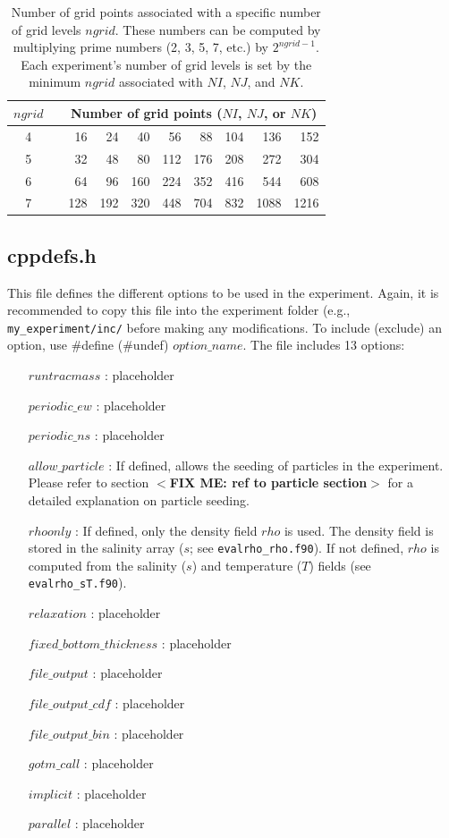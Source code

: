 \documentclass[12pt,letterpaper,titlepage]{article}
\newcommand{\fixme}[1]{\color{red}$<$\textbf{FIX ME: #1}$>$\color{black}}
\begin{document}
\begin{table}[t]
	\caption{\label{tab: ngrid} Number of grid points associated with a specific number of grid levels $ngrid$. These numbers can be computed by multiplying prime numbers (2, 3, 5, 7, etc.) by $2^{ngrid-1}$. Each experiment's number of grid levels is set by the minimum $ngrid$ associated with $NI$, $NJ$, and $NK$.}
	\centering
	\begin{tabular}{ccrrrrrrrr}
		\toprule
		$ngrid$& & \multicolumn{8}{c}{Number of grid points ($NI$, $NJ$, or $NK$)}\\
		\midrule
		4 & &  16  &  24  &  40  &  56  &  88  &  104  &  136  &  152 \\
		5 & &  32  &  48  &  80  &  112  &  176  &  208  &  272  &  304 \\
		6 & &  64  &  96  &  160  &  224  &  352  &  416  &  544  &  608 \\				
		7 & &  128  &  192  &  320  &  448  &  704  &  832  &  1088  &  1216 \\
		\bottomrule
	\end{tabular}
	\label{tab: multiple_regression}
\end{table}

\subsection{cppdefs.h}
\label{sec: cppdefs}
This file defines the different options to be used in the experiment. Again, it is recommended to copy this file into the experiment folder (e.g., \texttt{my\_experiment/inc/} before making any modifications. To include (exclude) an option, use \#define (\#undef) $option\_name$. The file includes 13 options:

\begin{enumerate}
	\item[$runtracmass$ :] placeholder
	\item[$periodic\_ew$ :] placeholder
	\item[$periodic\_ns$ :] placeholder
	\item[$allow\_particle$ :] If defined, allows the seeding of particles in the experiment. Please refer to section \fixme{ref to particle section} for a detailed explanation on particle seeding.
	\item[$rhoonly$ :] If defined, only the density field $rho$ is used. The density field is stored in the salinity array ($s$; see \texttt{evalrho\_rho.f90}). If not defined, $rho$ is computed from the salinity ($s$) and temperature ($T$) fields (see \texttt{evalrho\_sT.f90}).
	\item[$relaxation$ :] placeholder
	\item[$fixed\_bottom\_thickness$ :] placeholder
	\item[$file\_output$ :] placeholder
	\item[$file\_output\_cdf$ :] placeholder
	\item[$file\_output\_bin$ :] placeholder
	\item[$gotm\_call$ :] placeholder
	\item[$implicit$ :] placeholder
	\item[$parallel$ :] placeholder
\end{enumerate}
\end{document}
